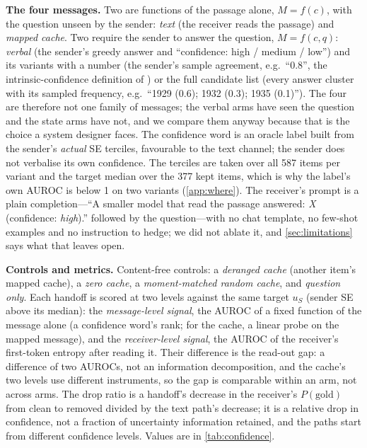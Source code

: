 \documentclass{article}
\begin{document}
\textbf{The four messages.} Two are functions of the passage alone, $M = f(c)$, with the question unseen by the sender: \emph{text} (the receiver reads the passage) and \emph{mapped cache}. Two require the sender to answer the question, $M = f(c, q)$: \emph{verbal} (the sender's greedy answer and ``confidence: high / medium / low'') and its variants with a number (the sender's sample agreement, e.g.\ ``0.8'', the intrinsic-confidence definition of \citet{yona2024can}) or the full candidate list (every answer cluster with its sampled frequency, e.g.\ ``1929 (0.6); 1932 (0.3); 1935 (0.1)''). The four are therefore not one family of messages; the verbal arms have seen the question and the state arms have not, and we compare them anyway because that is the choice a system designer faces. The confidence word is an oracle label built from the sender's \emph{actual} SE terciles, favourable to the text channel; the sender does not verbalise its own confidence. The terciles are taken over all 587 items per variant and the target median over the 377 kept items, which is why the label's own AUROC is below 1 on two variants (\cref{app:where}). The receiver's prompt is a plain completion---``A smaller model that read the passage answered: \emph{X} (confidence: \emph{high}).'' followed by the question---with no chat template, no few-shot examples and no instruction to hedge; we did not ablate it, and \cref{sec:limitations} says what that leaves open.

\textbf{Controls and metrics.} Content-free controls: a \emph{deranged cache} (another item's mapped cache), a \emph{zero cache}, a \emph{moment-matched random cache}, and \emph{question only}. Each handoff is scored at two levels against the same target $u_S$ (sender SE above its median): the \emph{message-level signal}, the AUROC of a fixed function of the message alone (a confidence word's rank; for the cache, a linear probe on the mapped message), and the \emph{receiver-level signal}, the AUROC of the receiver's first-token entropy after reading it. Their difference is the read-out gap: a difference of two AUROCs, not an information decomposition, and the cache's two levels use different instruments, so the gap is comparable within an arm, not across arms. The drop ratio is a handoff's decrease in the receiver's $P(\text{gold})$ from clean to removed divided by the text path's decrease; it is a relative drop in confidence, not a fraction of uncertainty information retained, and the paths start from different confidence levels. Values are in \cref{tab:confidence}.
\end{document}
